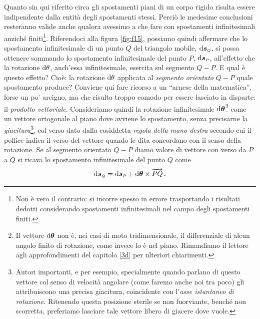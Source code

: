 \noindent Quanto sin qui riferito circa gli spostamenti piani di un corpo rigido
risulta essere indipendente dalla entit\`a degli spostamenti stessi. Perci\`o le medesime conclusioni resteranno valide anche qualora avessimo a che fare con
spostamenti infinitesimali anzich\'e finiti\footnote{Non \`e vero il contrario: si incorre spesso in errore
trasportando i risultati dedotti considerando spostamenti infinitesimali nel
campo degli spostamenti finiti.}.
Riferendoci alla figura \ref{fig:f15}, possiamo quindi affermare che lo spostamento infinitesimale di un punto $Q$ del triangolo mobile,
{${\rm d} \bm{s}_{\scriptscriptstyle{Q}}$}, 
si possa ottenere sommando lo spostamento infinitesimale
del punto $P$,
{${\rm d} \bm{s}_{\scriptscriptstyle{P}}$}, 
all'effetto che la  rotazione ${\rm d} \theta$, anch'essa infinitesimale,
esercita sul segmento $Q - P$.
E qual \`e questo effetto? Cio\`e: la rotazione ${\rm d} \theta$ applicata
al {\em segmento orientato} $Q - P$ quale
spostamento produce? Conviene qui fare ricorso
a un ``arnese della matematica'', forse un po' arcigno, 
ma che  risulta troppo comodo
per essere lasciato in disparte: il {\em prodotto vettoriale}. Consideriamo quindi la rotazione infinitesimale
${\rm d} \bm{\theta}$\footnote
{
Il vettore ${\rm d} \bm{\theta}$ non \`e, nei casi di moto tridimensionale, il
differenziale di alcun angolo finito di rotazione,
come invece lo \`e nel piano. Rimandiamo
il lettore agli approfondimenti del capitolo \ref{3d} per ulteriori chiarimenti.
}
 come un 
vettore ortogonale al piano dove avviene lo spostamento, senza precisarne
la {\em giacitura}\footnote{Autori importanti, \cite{whittaker} e
\cite{finzi} per esempio, specialmente quando parlano di questo vettore
col senso di velocit\`a angolare (come faremo anche noi tra poco) 
gli  attribuiscono una precisa giacitura, coincidente con
l'{\em asse istantaneo di rotazione}. Ritenendo questa posizione
sterile se non fuorviante, bench\'e non scorretta, preferiamo lasciare tale
vettore
libero di giacere dove vuole.}, col verso dato dalla cosiddetta {\em regola
della mano destra} secondo cui il pollice
indica il verso del vettore quando le dita concordano con il senso della
rotazione.
Se al segmento orientato $Q - P$ diamo valore di vettore con 
verso da $P$ a $Q$ si ricava lo spostamento infinitesimale del punto $Q$ come
\begin{equation}
	{\rm d} \bm{s}_{\scriptscriptstyle{Q}} =
	{\rm d} \bm{s}_{\scriptscriptstyle{P}}
	+{\rm d} \bm{\theta} \times \overrightarrow{PQ}\,.
	\label{e14}
\end{equation}	

